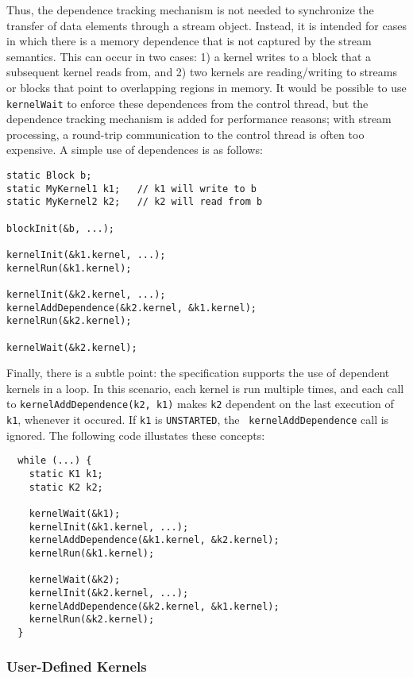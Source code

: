 Thus, the dependence tracking mechanism is not needed to synchronize
the transfer of data elements through a stream object.  Instead, it is
intended for cases in which there is a memory dependence that is not
captured by the stream semantics.  This can occur in two cases: 1) a
kernel writes to a block that a subsequent kernel reads from, and 2)
two kernels are reading/writing to streams or blocks that point to
overlapping regions in memory.  It would be possible to use {\tt
kernelWait} to enforce these dependences from the control thread, but
the dependence tracking mechanism is added for performance reasons;
with stream processing, a round-trip communication to the control
thread is often too expensive.  A simple use of dependences is as
follows:

{\small
\begin{verbatim}
static Block b;
static MyKernel1 k1;   // k1 will write to b
static MyKernel2 k2;   // k2 will read from b

blockInit(&b, ...);

kernelInit(&k1.kernel, ...);  
kernelRun(&k1.kernel);

kernelInit(&k2.kernel, ...);
kernelAddDependence(&k2.kernel, &k1.kernel);
kernelRun(&k2.kernel);

kernelWait(&k2.kernel);
\end{verbatim}}

Finally, there is a subtle point: the specification supports the use
of dependent kernels in a loop.  In this scenario, each kernel is run
multiple times, and each call to {\tt kernelAddDependence(k2, k1)}
makes {\tt k2} dependent on the last execution of {\tt k1}, whenever
it occured. If {\tt k1} is {\tt UNSTARTED}, the {\tt
kernelAddDependence} call is ignored. The following code illustates
these concepts:

{\small
\begin{verbatim}
  while (...) {
    static K1 k1;
    static K2 k2;

    kernelWait(&k1);
    kernelInit(&k1.kernel, ...);
    kernelAddDependence(&k1.kernel, &k2.kernel);
    kernelRun(&k1.kernel);

    kernelWait(&k2);
    kernelInit(&k2.kernel, ...);
    kernelAddDependence(&k2.kernel, &k1.kernel);
    kernelRun(&k2.kernel);
  }
\end{verbatim}}

\subsubsection{User-Defined Kernels}
\label{sec:kernelhlc}


